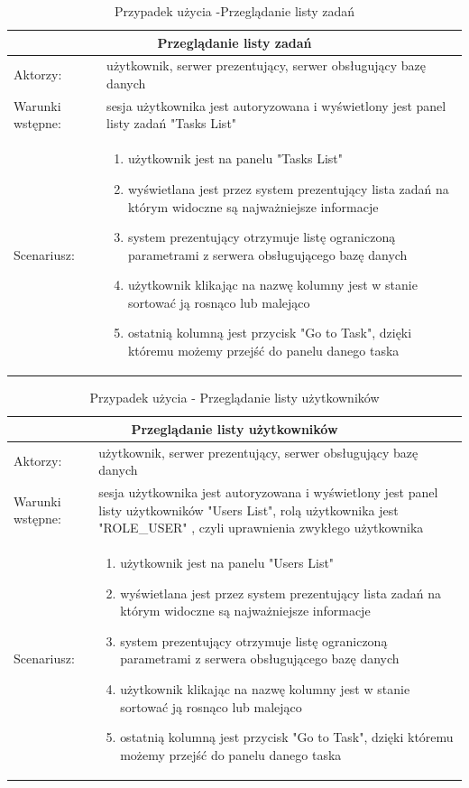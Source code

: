 \begin{table}[h!]
	\begin{tabular}{|p{2cm}||p{13cm}|  }

\hline
\multicolumn{2}{|c|}{Przeglądanie listy zadań} \\
\hline
Aktorzy: &użytkownik, serwer prezentujący, serwer obsługujący bazę danych\\
\hline
Warunki wstępne:& sesja użytkownika jest autoryzowana i wyświetlony jest panel listy zadań "Tasks List"\\
\hline
Scenariusz: &
\begin{enumerate}
\item użytkownik jest na panelu "Tasks List"
\item wyświetlana jest przez system prezentujący  lista zadań na którym widoczne są najważniejsze informacje
\item system prezentujący otrzymuje listę ograniczoną parametrami z serwera obsługującego bazę danych
\item użytkownik klikając na nazwę kolumny jest w stanie sortować ją rosnąco lub malejąco
\item ostatnią kolumną jest przycisk "Go to Task", dzięki któremu możemy przejść do panelu danego taska
\end{enumerate}\\
\hline
	\end{tabular}
\caption{Przypadek użycia -Przeglądanie listy zadań}
\end{table}




\begin{table}[h!]
	\begin{tabular}{|p{2cm}||p{13cm}|  }
		
		\hline
		\multicolumn{2}{|c|}{Przeglądanie listy użytkowników} \\
		\hline
Aktorzy: &użytkownik, serwer prezentujący, serwer obsługujący bazę danych\\
		\hline
Warunki wstępne: &sesja użytkownika jest autoryzowana i wyświetlony jest panel listy użytkowników  "Users List", rolą użytkownika jest "ROLE\_USER" , czyli uprawnienia zwykłego użytkownika\\
		\hline
		Scenariusz: &
		\begin{enumerate}
			\item użytkownik jest na panelu "Users List"
		\item wyświetlana jest przez system prezentujący  lista zadań na którym widoczne są najważniejsze informacje
		\item system prezentujący otrzymuje listę ograniczoną parametrami z serwera obsługującego bazę danych
		\item użytkownik klikając na nazwę kolumny jest w stanie sortować ją rosnąco lub malejąco
		\item ostatnią kolumną jest przycisk "Go to Task", dzięki któremu możemy przejść do panelu danego taska
		\end{enumerate}\\
	\hline
	\end{tabular}
	\caption{Przypadek użycia - Przeglądanie listy użytkowników}
\end{table}



